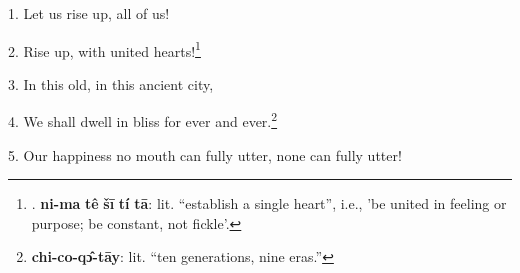 \setcounter{footnote}{0}

1. Let us rise up, all of us!

2. Rise up, with united hearts!\footnote{. \textbf{ni-ma} \textbf{tê} \textbf{šī} \textbf{tí} \textbf{tā}: lit. ``establish a single heart'', i.e., 'be united in feeling or purpose; be constant, not fickle'.}

3. In this old, in this ancient city,

4. We shall dwell in bliss for ever and ever.\footnote{\textbf{chi-co-qɔ̂-tāy}: lit. ``ten generations, nine eras.''}

5. Our happiness no mouth can fully utter, none can fully utter!


